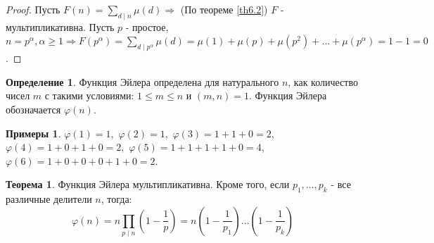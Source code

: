 \documentclass[a4paper, 12pt]{article}
\renewcommand{\phi}{\varphi}
\renewcommand{\div}{\mid}
\theoremstyle{definition}
\newtheorem{definition}{Определение}[section]
\newtheorem{theorem}{Теорема}[section]
\newtheorem*{examples}{Примеры}
\begin{document}
    \begin{proof}
        Пусть $F(n)=\sum\limits_{d\div n}\mu(d)\Rightarrow$ (По теореме \ref{th6.2}) $F$ - мультипликативна. Пусть $p$ - простое, $n=p^{\alpha}, \alpha\geq 1 \Rightarrow F(p^{\alpha})=\sum\limits_{d\div p^{\alpha}}\mu(d)=\mu(1)+\mu(p)+\mu(p^2)+\dots +\mu(p^{\alpha})=1-1=0$.
    \end{proof}
    \begin{definition}
        Функция Эйлера определена для натурального $n$, как количество чисел $m$ с такими условиями: $1\leq m\leq n$ и $(m,n)=1$. Функция Эйлера обозначается $\phi(n)$.
    \end{definition}
    \begin{examples}
        $\phi(1)=1$,\ $\phi(2)=1$,\ $\phi(3)=1+1+0=2$,\ $\phi(4)=1+0+1+0=2$,\ $\phi(5)=1+1+1+1+0=4$,\ $\phi(6)=1+0+0+0+1+0=2$.
    \end{examples}
    \begin{theorem}
        Функция Эйлера мультипликативна. Кроме того, если $p_1,\dots,p_k$ - все различные делители $n$, тогда:
        \[\phi(n)=n\prod\limits_{p\div n}(1-\frac{1}{p})=n(1-\frac{1}{p_1})\dots(1-\frac{1}{p_k})\]
    \end{theorem} 
\end{document}
